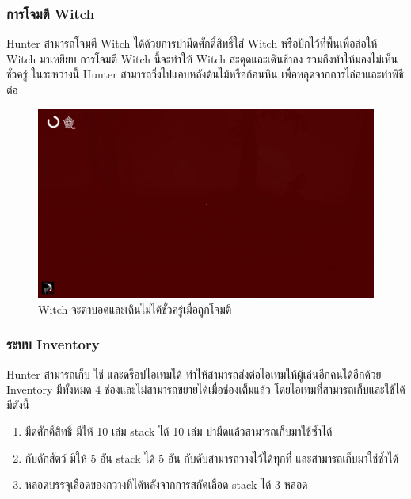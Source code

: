 \subsubsection{การโจมตี Witch}

Hunter สามารถโจมตี Witch ได้ด้วยการปามีดศักดิ์สิทธิ์ใส่ Witch หรือปักไว้ที่พื้นเพื่อล่อให้ Witch มาเหยียบ การโจมตี Witch นี้จะทำให้ Witch สะดุดและเดินช้าลง 
รวมถึงทำให้มองไม่เห็นชั่วครู่ ในระหว่างนี้ Hunter สามารถวิ่งไปแอบหลังต้นไม้หรือก้อนหิน เพื่อหลุดจากการไล่ล่าและทำพิธีต่อ

\begin{figure}[h]
  \begin{center}
  \includegraphics[width=\textwidth]{./img/mechanics/witch_blind.png}
  \end{center}
  \caption[Witch จะตาบอดและเดินไม่ได้ชั่วครู่เมื่อถูกโจมตี]{Witch จะตาบอดและเดินไม่ได้ชั่วครู่เมื่อถูกโจมตี}
  \label{Witch จะตาบอดและเดินไม่ได้ชั่วครู่เมื่อถูกโจมตี}
\end{figure}

\subsubsection{ระบบ Inventory}

Hunter สามารถเก็บ ใช้ และดร็อปไอเทมได้ ทำให้สามารถส่งต่อไอเทมให้ผู้เล่นอีกคนได้อีกด้วย Inventory มีทั้งหมด 4 ช่องและไม่สามารถขยายได้เมื่อช่องเต็มแล้ว
โดยไอเทมที่สามารถเก็บและใช้ได้ มีดังนี้
\begin{enumerate}
  \item มีดศักดิ์สิทธิ์ มีให้ 10 เล่ม stack ได้ 10 เล่ม ปามีดแล้วสามารถเก็บมาใช้ซ้ำได้
  \item กับดักสัตว์ มีให้ 5 อัน stack ได้ 5 อัน กับดับสามารถวางไว้ได้ทุกที่ และสามารถเก็บมาใช้ซ้ำได้
  \item หลอดบรรจุเลือดของกวางที่ได้หลังจากการสกัดเลือด stack ได้ 3 หลอด
\end{enumerate}

